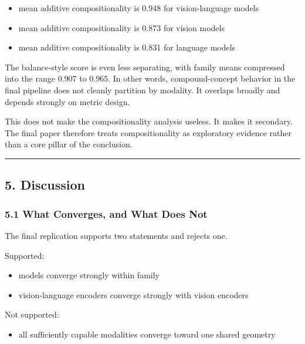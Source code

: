 \documentclass[
]{article}
\providecommand{\tightlist}{%
  \setlength{\itemsep}{0pt}\setlength{\parskip}{0pt}}
\begin{document}
\begin{itemize}
\tightlist
\item
  mean additive compositionality is 0.948 for vision-language models
\item
  mean additive compositionality is 0.873 for vision models
\item
  mean additive compositionality is 0.831 for language models
\end{itemize}

The balance-style score is even less separating, with family means
compressed into the range 0.907 to 0.965. In other words,
compound-concept behavior in the final pipeline does not cleanly
partition by modality. It overlaps broadly and depends strongly on
metric design.

This does not make the compositionality analysis useless. It makes it
secondary. The final paper therefore treats compositionality as
exploratory evidence rather than a core pillar of the conclusion.

\begin{center}\rule{0.5\linewidth}{0.5pt}\end{center}

\subsection{5. Discussion}\label{discussion}

\subsubsection{5.1 What Converges, and What Does
Not}\label{what-converges-and-what-does-not}

The final replication supports two statements and rejects one.

Supported:

\begin{itemize}
\tightlist
\item
  models converge strongly within family
\item
  vision-language encoders converge strongly with vision encoders
\end{itemize}

Not supported:

\begin{itemize}
\tightlist
\item
  all sufficiently capable modalities converge toward one shared
  geometry
\end{itemize}
\end{document}

